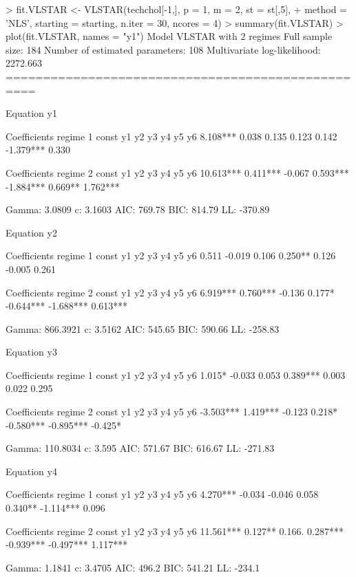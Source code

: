 \begin{example}
>  fit.VLSTAR <- VLSTAR(techchol[-1,], p = 1, m = 2, st = st[,5],
+	method = 'NLS', starting = starting, n.iter = 30, ncores = 4)
> summary(fit.VLSTAR)
> plot(fit.VLSTAR, names = "y1")
Model VLSTAR with 2 regimes
Full sample size: 184 
Number of estimated parameters: 108 	Multivariate log-likelihood: 2272.663 
==================================================

Equation y1 

Coefficients regime 1 
const        y1        y2        y3        y4        y5        y6 
8.108***    0.038     0.135     0.123     0.142  -1.379***    0.330  

Coefficients regime 2 
const        y1        y2        y3        y4        y5        y6 
10.613***  0.411***   -0.067   0.593*** -1.884***   0.669**  1.762*** 

Gamma: 3.0809 	c: 3.1603 
AIC: 769.78 	BIC: 814.79 	LL: -370.89 

Equation y2 

Coefficients regime 1 
const      y1      y2      y3      y4      y5      y6 
0.511  -0.019   0.106  0.250**  0.126  -0.005   0.261  

Coefficients regime 2 
const        y1        y2        y3        y4        y5        y6 
6.919***  0.760***   -0.136     0.177* -0.644*** -1.688***  0.613*** 

Gamma: 866.3921 	c: 3.5162 
AIC: 545.65 	BIC: 590.66 	LL: -258.83 

Equation y3 

Coefficients regime 1 
const       y1       y2       y3       y4       y5       y6 
1.015*  -0.033    0.053  0.389***   0.003    0.022    0.295  

Coefficients regime 2 
const        y1        y2        y3        y4        y5        y6 
-3.503***  1.419***   -0.123     0.218* -0.580*** -0.895***   -0.425* 

Gamma: 110.8034 	c: 3.595 
AIC: 571.67 	BIC: 616.67 	LL: -271.83 

Equation y4 

Coefficients regime 1 
const        y1        y2        y3        y4        y5        y6 
4.270***   -0.034    -0.046     0.058    0.340** -1.114***    0.096  

Coefficients regime 2 
const        y1        y2        y3        y4        y5        y6 
11.561***   0.127**    0.166.  0.287*** -0.939*** -0.497***  1.117*** 

Gamma: 1.1841 	c: 3.4705 
AIC: 496.2 	BIC: 541.21 	LL: -234.1 


\end{example}
